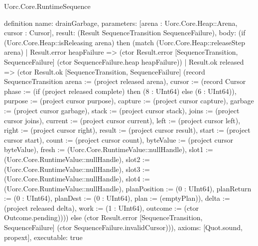 \begin{lexlean}{Uorc.Core.RuntimeSequence}
\begin{semanticmodule}
definition{
  name: drainGarbage,
  parameters: [arena : Uorc.Core.Heap::Arena, cursor : Cursor],
  result: (Result SequenceTransition SequenceFailure),
  body: (if (Uorc.Core.Heap::isReleasing arena) then (match (Uorc.Core.Heap::releaseStep arena)
    | Result.error heapFailure => (ctor Result.error [SequenceTransition, SequenceFailure] (ctor SequenceFailure.heap heapFailure))
    | Result.ok released => (ctor Result.ok [SequenceTransition, SequenceFailure] (record SequenceTransition {arena := (project released arena), cursor := (record Cursor {phase := (if (project released complete) then (8 : UInt64) else (6 : UInt64)), purpose := (project cursor purpose), capture := (project cursor capture), garbage := (project cursor garbage), stack := (project cursor stack), joins := (project cursor joins), current := (project cursor current), left := (project cursor left), right := (project cursor right), result := (project cursor result), start := (project cursor start), count := (project cursor count), byteValue := (project cursor byteValue), fresh := (Uorc.Core.RuntimeValue::nullHandle), slot1 := (Uorc.Core.RuntimeValue::nullHandle), slot2 := (Uorc.Core.RuntimeValue::nullHandle), slot3 := (Uorc.Core.RuntimeValue::nullHandle), slot4 := (Uorc.Core.RuntimeValue::nullHandle), planPosition := (0 : UInt64), planReturn := (0 : UInt64), planDest := (0 : UInt64), plan := (emptyPlan)}), delta := (project released delta), work := (1 : UInt64), outcome := (ctor Outcome.pending)}))) else (ctor Result.error [SequenceTransition, SequenceFailure] (ctor SequenceFailure.invalidCursor))),
  axioms: [Quot.sound, propext],
  executable: true
}


\end{semanticmodule}
\end{lexlean}
